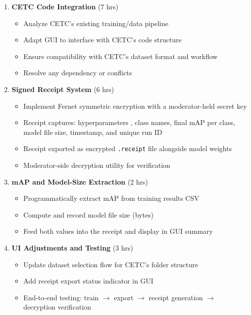 \documentclass[a4paper]{article}
\begin{document}
\begin{enumerate}[leftmargin=*]
    \item \textbf{CETC Code Integration} (7 hrs)
    \begin{itemize}
        \item Analyze CETC's existing training/data pipeline
        \item Adapt GUI to interface with CETC's code structure
        \item Ensure compatibility with CETC's dataset format and workflow
        \item Resolve any dependency or conflicts
    \end{itemize}

    \item \textbf{Signed Receipt System} (6 hrs)
    \begin{itemize}
        \item Implement Fernet symmetric encryption with a moderator-held secret key
        \item Receipt captures: hyperparameters , class names, final mAP per class, model file size, timestamp, and unique run ID
        \item Receipt exported as encrypted \texttt{.receipt} file alongside model weights
        \item Moderator-side decryption utility for verification
    \end{itemize}

    \item \textbf{mAP and Model-Size Extraction} (2 hrs)
    \begin{itemize}
        \item Programmatically extract mAP from training results CSV
        \item Compute and record model file size (bytes)
        \item Feed both values into the receipt and display in GUI summary
    \end{itemize}

    \item \textbf{UI Adjustments and Testing} (3 hrs)
    \begin{itemize}
        \item Update dataset selection flow for CETC's folder structure
        \item Add receipt export status indicator in GUI
        \item End-to-end testing: train $\rightarrow$ export $\rightarrow$ receipt generation $\rightarrow$ decryption verification
    \end{itemize}
\end{enumerate}
\end{document}
